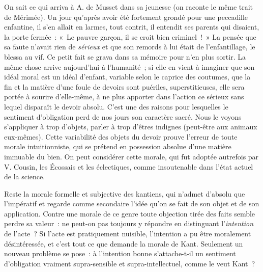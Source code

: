 \documentclass[french,twoside]{book} %
\begin{document}
On sait ce qui arriva à A. de Musset dans sa jeunesse (on raconte le même trait de Mérimée). Un jour qu’après avoir été fortement grondé pour une peccadille enfantine, il s’en allait en larmes, tout contrit, il entendit ses parents qui disaient, la porte fermée : « Le pauvre garçon, il se croit bien criminel ! » La pensée que sa faute n’avait rien de \emph{sérieux} et que son remords à lui était de l’enfantillage, le blessa au vif. Ce petit fait se grava dans sa mémoire pour n’en plus sortir. La même chose arrive aujourd’hui à l’humanité ; si elle en vient à imaginer que son idéal moral est un idéal d’enfant, variable selon le caprice des coutumes, que la fin et la matière d’une foule de devoirs sont puériles, superstitieuses, elle sera portée à sourire d’elle-même, à ne plus apporter dans l’action ce sérieux sans lequel disparaît le devoir absolu. C’est une des raisons pour lesquelles le sentiment d’obligation perd de nos jours son caractère sacré. Nous le voyons s’appliquer à trop d’objets, parler à trop d’êtres indignes (peut-être aux animaux eux-mêmes). Cette variabilité des objets du devoir prouve l’erreur de toute morale intuitionniste, qui se prétend en possession absolue d’une matière immuable du bien. On peut considérer cette morale, qui fut adoptée autrefois par V. Cousin, les Écossais et les éclectiques, comme insoutenable dans l’état actuel de la science.\par
Reste la morale formelle et subjective des kantiens, qui n’admet d’absolu que l’impératif et regarde comme secondaire l’idée qu’on se fait de son objet et de son application. Contre une morale de ce genre toute objection tirée des faits semble perdre sa valeur : ne peut-on pas toujours y répondre en distinguant l’\emph{intention} de l’acte ? Si l’acte est pratiquement nuisible, l’intention a pu être moralement désintéressée, et c’est tout ce que demande la morale de Kant. Seulement un nouveau problème se pose : à l’intention bonne s’attache-t-il un sentiment d’obligation vraiment supra-sensible et supra-intellectuel, comme le veut Kant ?\par
\end{document}
